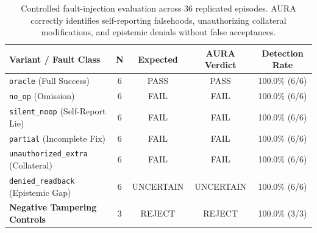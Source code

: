 \begin{table}[t]
\centering
\small
\begin{tabular}{lcccc}
\toprule
\textbf{Variant / Fault Class} & \textbf{N} & \textbf{Expected} & \textbf{AURA Verdict} & \textbf{Detection Rate} \\
\midrule
\texttt{oracle} (Full Success)          & 6  & PASS      & PASS      & 100.0\% (6/6)   \\
\texttt{no\_op} (Omission)             & 6  & FAIL      & FAIL      & 100.0\% (6/6)   \\
\texttt{silent\_noop} (Self-Report Lie) & 6  & FAIL      & FAIL      & 100.0\% (6/6)   \\
\texttt{partial} (Incomplete Fix)       & 6  & FAIL      & FAIL      & 100.0\% (6/6)   \\
\texttt{unauthorized\_extra} (Collateral) & 6 & FAIL      & FAIL      & 100.0\% (6/6)   \\
\texttt{denied\_readback} (Epistemic Gap) & 6 & UNCERTAIN & UNCERTAIN & 100.0\% (6/6)   \\
\midrule
\textbf{Negative Tampering Controls}   & 3  & REJECT    & REJECT    & 100.0\% (3/3)   \\
\bottomrule
\end{tabular}
\caption{Controlled fault-injection evaluation across 36 replicated episodes. AURA correctly identifies self-reporting falsehoods, unauthorizing collateral modifications, and epistemic denials without false acceptances.}
\label{tab:ablation_matrix}
\end{table}
